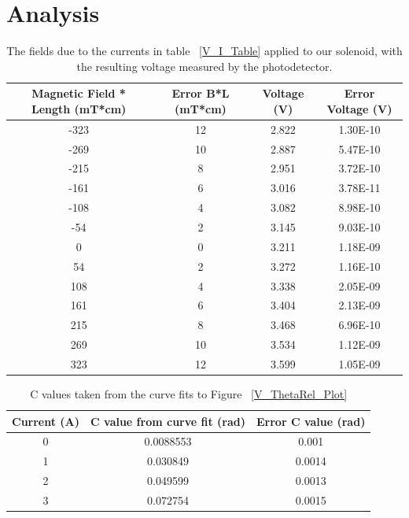 \documentclass[prb,preprint]{revtex4-1}
\begin{document}
\section{Analysis}


\begin{table}[h!]
\centering
\caption{The fields due to the currents in table ~\ref{V_I_Table} applied to our solenoid, with the resulting voltage measured by the photodetector. }
\begin{ruledtabular}
\begin{tabular}{c c c c}
Magnetic Field * Length (mT*cm) & Error B*L (mT*cm) & Voltage (V) & Error Voltage (V)\\
\hline	%
-323 & 12 & 2.822 & 1.30E-10 \\
-269 & 10 & 2.887 & 5.47E-10 \\
-215 & 8  & 2.951 & 3.72E-10 \\
-161 & 6  & 3.016 & 3.78E-11 \\
-108 & 4  & 3.082 & 8.98E-10 \\
-54  & 2  & 3.145 & 9.03E-10 \\
0    & 0  & 3.211 & 1.18E-09 \\
54   & 2  & 3.272 & 1.16E-10 \\
108  & 4  & 3.338 & 2.05E-09 \\
161  & 6  & 3.404 & 2.13E-09 \\
215  & 8  & 3.468 & 6.96E-10 \\
269  & 10 & 3.534 & 1.12E-09 \\
323  & 12 & 3.599 & 1.05E-09
\end{tabular}
\end{ruledtabular}
\label{V_B*L_Table}
\end{table}

\begin{table}[h!]
\centering
\caption{C values taken from the curve fits to Figure ~\ref{V_ThetaRel_Plot}}
\begin{ruledtabular}
\begin{tabular}{c c c}
Current (A) & C value from curve fit (rad) & Error C value (rad)\\
\hline	%
0 & 0.0088553 & 0.001  \\
1 & 0.030849  & 0.0014 \\
2 & 0.049599  & 0.0013 \\
3 & 0.072754  & 0.0015
\end{tabular}
\end{ruledtabular}
\label{I_cValue_Table}
\end{table}
\end{document}

